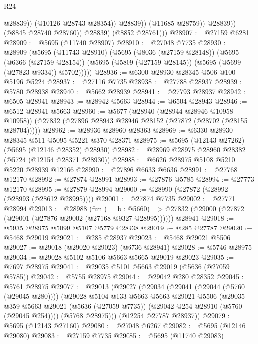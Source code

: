 \begin{lexlean}{R24}
\begin{coremodule}
                            @28839))
                        (@10126 @28743 @28354))
                      @28839))
                  (@11685 @28759))
                @28839))
            (@8845 @28740 @28760))
          @28839)
        (@8852 @28761)))
@28907 := @27159 @6281
@28909 := @5695 (@11740 @28907)
@28910 := @27048 @7735
@28930 := @28909
    (@5695
      (@11743 @28910)
      (@5695
        (@8036 (@27159 @28148))
        (@5695
          (@6366 (@27159 @28154))
          (@5695 (@5809 (@27159 @28145)) (@5695 (@5699 (@27823 @9334)) @5702)))))
@28936 := @6300 @28930 @28345 @506 @100 @5196 @5224
@28937 := @27116 @7735
@28938 := @27788 @28937
@28939 := @5780 @28938
@28940 := @5662 @28939
@28941 := @27793 @28937
@28942 := @6505 @28941
@28943 := @28942 @5663
@28944 := @6504 @28943
@28946 := @6512 @28941 @5663
@28960 := @5677
    (@28940 (@28944 @28946 @10958 @10958))
    (@27832 (@27896 @28943 @28946 @28152 (@27872 (@28702 (@28155 @28704)))))
@28962 := @28936 @28960 @28363
@28969 := @6330 @28930 @28345 @511 @5095 @5221 @370 @28371
@28975 := @5695 (@12143 @27262) (@5695 (@12146 @28352) @28930)
@28982 := @28969 @28975 @28960 @28382 (@5724 (@12154 @28371 @28930))
@28988 := @6626 @28975 @5108 @5210 @5220 @28939 @12166
@28990 := @27896 @6633 @6636
@28991 := @27768 @12170
@28992 := @27874 @28991
@28993 := @27876 @5785
@28994 := @27773 @12170
@28995 := @27879 @28994
@29000 := @28990 (@27872 (@28992 (@28993 (@28612 @28995))))
@29001 := @27874 @7735
@29002 := @27771 @28994
@29013 := @28988
    (fun (__b : @5660) => @27832 (@29000 (@27872 (@29001 (@27876 @29002 (@27168 @9327 @28995))))))
    @28941
@29018 := @5935 @28975 @5099 @5107 @5779 @28938
@29019 := @285 @27787
@29020 := @5468 @29019
@29021 := @285 @28937
@29023 := @5468 @29021 @5506
@29027 := @29018 (@29020 @29023) (@6736 @28941)
@29028 := @5746 @28975
@29034 := @29028 @5102 @5106 @5663 @5665 @29019 @29023
@29035 := @7697 @28975
@29041 := @29035 @5101 @5663 @29019 (@5636 (@27059 @5785))
@29042 := @5755 @28975
@29044 := @29042 @280 @28352
@29045 := @5761 @28975
@29077 := @29013
    (@29027
      (@29034
        (@29041 (@29044 (@5760 (@29045 @280))))
        (@29028
          @5104
          @133
          @5663
          @5663
          @29021
          @5506
          (@29035
            @359
            @5663
            @29021
            (@5636 (@27059 @7735))
            (@29042 @254 @28910 (@5760 (@29045 @254))))
          (@5768 @28975)))
      (@12254 @27787 @28937))
@29079 := @5695 (@12143 @27160)
@29080 := @27048 @6267
@29082 := @5695 (@12146 @29080)
@29083 := @27159 @7735
@29085 := @5695 (@11740 @29083)

\end{coremodule}
\end{lexlean}
